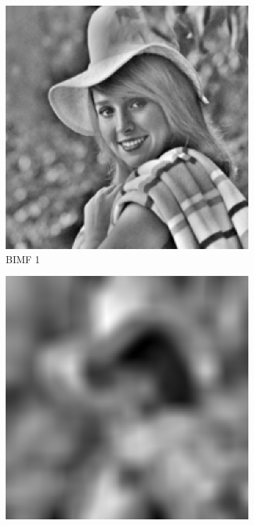 \begin{figure}
\centering
\begin{subfigure}{.30\textwidth}
  \centering
  \includegraphics[width=.9\linewidth]{img/e_1_4_1}
  \caption{BIMF 1}
\end{subfigure}
\begin{subfigure}{.30\textwidth}
  \centering
  \includegraphics[width=.9\linewidth]{img/e_1_4_2}

\end{subfigure}
\end{figure}
